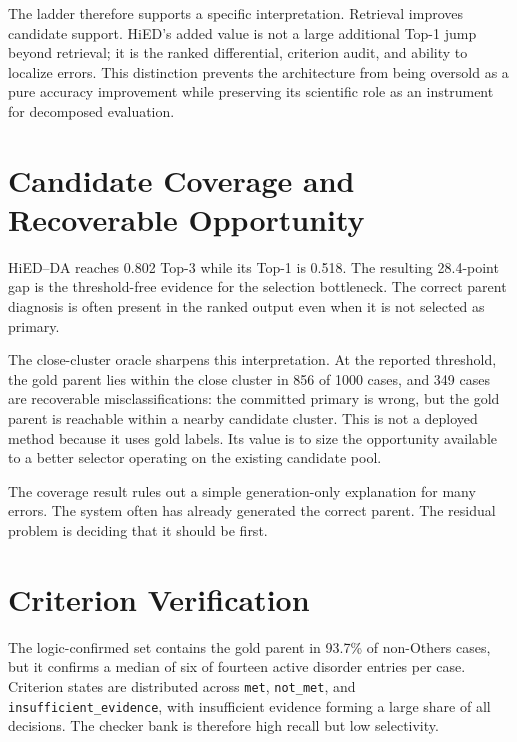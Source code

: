 The ladder therefore supports a specific interpretation. Retrieval improves candidate support. HiED's added value is not a large additional Top-1 jump beyond retrieval; it is the ranked differential, criterion audit, and ability to localize errors. This distinction prevents the architecture from being oversold as a pure accuracy improvement while preserving its scientific role as an instrument for decomposed evaluation.

\section{Candidate Coverage and Recoverable Opportunity}


HiED--DA reaches 0.802 Top-3 while its Top-1 is 0.518. The resulting 28.4-point gap is the threshold-free evidence for the selection bottleneck. The correct parent diagnosis is often present in the ranked output even when it is not selected as primary.

The close-cluster oracle sharpens this interpretation. At the reported threshold, the gold parent lies within the close cluster in 856 of 1000 cases, and 349 cases are recoverable misclassifications: the committed primary is wrong, but the gold parent is reachable within a nearby candidate cluster. This is not a deployed method because it uses gold labels. Its value is to size the opportunity available to a better selector operating on the existing candidate pool.

The coverage result rules out a simple generation-only explanation for many errors. The system often has already generated the correct parent. The residual problem is deciding that it should be first.

\section{Criterion Verification}

The logic-confirmed set contains the gold parent in 93.7\% of non-Others cases, but it confirms a median of six of fourteen active disorder entries per case. Criterion states are distributed across \texttt{met}, \texttt{not\_met}, and \texttt{insufficient\_evidence}, with insufficient evidence forming a large share of all decisions. The checker bank is therefore high recall but low selectivity.

